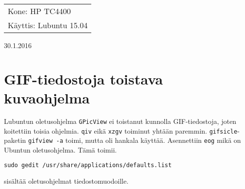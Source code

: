 \documentclass[main.tex]{subfiles}
\begin{document}
\thispagestyle{empty}
\begin{tabular}[t]{l}
Kone: HP TC4400\\
Käyttis: Lubuntu 15.04
\end{tabular}
\hfill 30.1.2016

{\section{GIF-tiedostoja toistava kuvaohjelma}}
 
Lubuntun oletusohjelma \texttt{GPicView} ei toistanut kunnolla GIF-tiedostoja, joten koitettiin toisia ohjelmia. \texttt{qiv} eikä \texttt{xzgv} toiminut yhtään paremmin. \texttt{gifsicle}-paketin \texttt{gifview -a} toimi, mutta oli hankala käyttää. Asennettiin \texttt{eog} mikä on Ubuntun oletusohjelma. Tämä toimii.

\begin{lstlisting}
sudo gedit /usr/share/applications/defaults.list
\end{lstlisting}

sisältää oletusohjelmat tiedostomuodoille.
\end{document}
